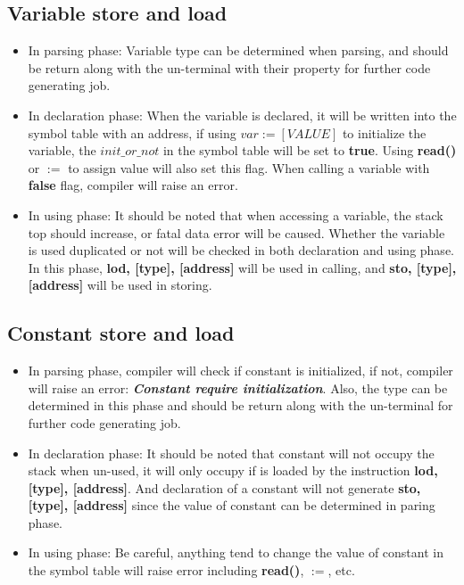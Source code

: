 \documentclass{article}
\begin{document}
		\subsection{Variable store and load}
		\begin{itemize}
		\item In parsing phase: Variable type can be determined when parsing, and should be return along with the un-terminal with their property for further code generating job.
		\item In declaration phase: When the variable is declared, it will be written into the symbol table with an address, if using $ var := [VALUE] $ to initialize the variable, the $ init\_or\_not $ in the symbol table will be set to \textbf{true}. Using \textbf{read()} or $ := $ to assign value will also set this flag. When calling a variable with \textbf{false} flag, compiler will raise an error. 
		\item In using phase: It should be noted that when accessing a variable, the stack top should increase, or fatal data error will be caused. Whether the variable is used duplicated or not will be checked in both declaration and using phase. In this phase, \textbf{lod, [type], [address]} will be used in calling, and \textbf{sto, [type], [address]} will be used in storing.
		\end{itemize}
		\subsection{Constant store and load}
		\begin{itemize}
		\item In parsing phase, compiler will check if constant is initialized, if not, compiler will raise an error: \textbf{\emph{Constant require initialization}}. Also, the type can be determined in this phase and should be return along with the un-terminal for further code generating job. 
		\item In declaration phase: It should be noted that constant will not occupy the stack when un-used, it will only occupy if is loaded by the instruction \textbf{lod, [type], [address]}. And declaration of a constant will not generate \textbf{sto, [type], [address]} since the value of constant can be determined in paring phase. 
		\item In using phase: Be careful, anything tend to change the value of constant in the symbol table will raise error including \textbf{read()}, \textbf{$ := $}, etc. 
		\end{itemize}
\end{document}
